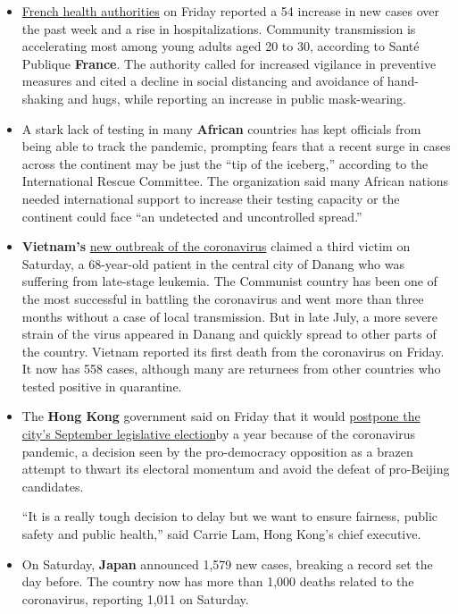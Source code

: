 \begin{itemize}
\item
  \href{https://www.santepubliquefrance.fr/maladies-et-traumatismes/maladies-et-infections-respiratoires/infection-a-coronavirus/documents/bulletin-national/covid-19-point-epidemiologique-du-30-juillet-2020}{French
  health authorities} on Friday reported a 54 increase in new cases over
  the past week and a rise in hospitalizations. Community transmission
  is accelerating most among young adults aged 20 to 30, according to
  Santé Publique \textbf{France}. The authority called for increased
  vigilance in preventive measures and cited a decline in social
  distancing and avoidance of hand-shaking and hugs, while reporting an
  increase in public mask-wearing.
\item
  A stark lack of testing in many \textbf{African} countries has kept
  officials from being able to track the pandemic, prompting fears that
  a recent surge in cases across the continent may be just the ``tip of
  the iceberg,'' according to the International Rescue Committee. The
  organization said many African nations needed international support to
  increase their testing capacity or the continent could face ``an
  undetected and uncontrolled spread.''
\item
  \textbf{Vietnam's}
  \href{https://www.nytimes3xbfgragh.onion/2020/07/29/world/asia/coronavirus-vietnam.html}{new
  outbreak of the coronavirus} claimed a third victim on Saturday, a
  68-year-old patient in the central city of Danang who was suffering
  from late-stage leukemia. The Communist country has been one of the
  most successful in battling the coronavirus and went more than three
  months without a case of local transmission. But in late July, a more
  severe strain of the virus appeared in Danang and quickly spread to
  other parts of the country. Vietnam reported its first death from the
  coronavirus on Friday. It now has 558 cases, although many are
  returnees from other countries who tested positive in quarantine.
\item
  The \textbf{Hong Kong} government said on Friday that it would
  \href{https://www.nytimes3xbfgragh.onion/2020/07/31/world/asia/hong-kong-election-delayed.html}{postpone
  the city's September legislative election}by a year because of the
  coronavirus pandemic, a decision seen by the pro-democracy opposition
  as a brazen attempt to thwart its electoral momentum and avoid the
  defeat of pro-Beijing candidates.

  ``It is a really tough decision to delay but we want to ensure
  fairness, public safety and public health,'' said Carrie Lam, Hong
  Kong's chief executive.
\item
  On Saturday, \textbf{Japan} announced 1,579 new cases, breaking a
  record set the day before. The country now has more than 1,000 deaths
  related to the coronavirus, reporting 1,011 on Saturday.
\end{itemize}

